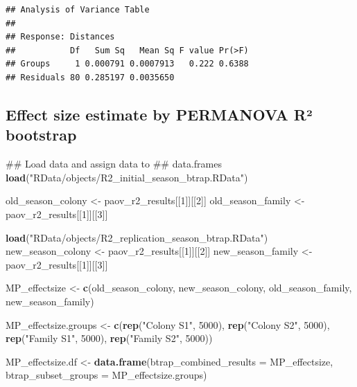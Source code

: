 \documentclass[]{article}
\newenvironment{Shaded}{\begin{snugshade}}{\end{snugshade}}
\newcommand{\KeywordTok}[1]{\textcolor[rgb]{0.13,0.29,0.53}{\textbf{#1}}}
\newcommand{\DataTypeTok}[1]{\textcolor[rgb]{0.13,0.29,0.53}{#1}}
\newcommand{\DecValTok}[1]{\textcolor[rgb]{0.00,0.00,0.81}{#1}}
\newcommand{\StringTok}[1]{\textcolor[rgb]{0.31,0.60,0.02}{#1}}
\newcommand{\NormalTok}[1]{#1}
\begin{document}
\begin{verbatim}
## Analysis of Variance Table
## 
## Response: Distances
##           Df   Sum Sq   Mean Sq F value Pr(>F)
## Groups     1 0.000791 0.0007913   0.222 0.6388
## Residuals 80 0.285197 0.0035650
\end{verbatim}

\subsection{Effect size estimate by PERMANOVA R²
bootstrap}\label{effect-size-estimate-by-permanova-r-bootstrap}

\begin{Shaded}
\begin{Highlighting}[]
\NormalTok{## Load data and assign data to}
\NormalTok{## data.frames}
\KeywordTok{load}\NormalTok{(}\StringTok{"RData/objects/R2_initial_season_btrap.RData"}\NormalTok{)}

\NormalTok{old_season_colony <-}\StringTok{ }\NormalTok{paov_r2_results[[}\DecValTok{1}\NormalTok{]][[}\DecValTok{2}\NormalTok{]]}
\NormalTok{old_season_family <-}\StringTok{ }\NormalTok{paov_r2_results[[}\DecValTok{1}\NormalTok{]][[}\DecValTok{3}\NormalTok{]]}

\KeywordTok{load}\NormalTok{(}\StringTok{"RData/objects/R2_replication_season_btrap.RData"}\NormalTok{)}
\NormalTok{new_season_colony <-}\StringTok{ }\NormalTok{paov_r2_results[[}\DecValTok{1}\NormalTok{]][[}\DecValTok{2}\NormalTok{]]}
\NormalTok{new_season_family <-}\StringTok{ }\NormalTok{paov_r2_results[[}\DecValTok{1}\NormalTok{]][[}\DecValTok{3}\NormalTok{]]}

\NormalTok{MP_effectsize <-}\StringTok{ }\KeywordTok{c}\NormalTok{(old_season_colony, new_season_colony, }
\NormalTok{    old_season_family, new_season_family)}

\NormalTok{MP_effectsize.groups <-}\StringTok{ }\KeywordTok{c}\NormalTok{(}\KeywordTok{rep}\NormalTok{(}\StringTok{"Colony S1"}\NormalTok{, }
    \DecValTok{5000}\NormalTok{), }\KeywordTok{rep}\NormalTok{(}\StringTok{"Colony S2"}\NormalTok{, }\DecValTok{5000}\NormalTok{), }\KeywordTok{rep}\NormalTok{(}\StringTok{"Family S1"}\NormalTok{, }
    \DecValTok{5000}\NormalTok{), }\KeywordTok{rep}\NormalTok{(}\StringTok{"Family S2"}\NormalTok{, }\DecValTok{5000}\NormalTok{))}

\NormalTok{MP_effectsize.df <-}\StringTok{ }\KeywordTok{data.frame}\NormalTok{(}\DataTypeTok{btrap_combined_results =}\NormalTok{ MP_effectsize, }
    \DataTypeTok{btrap_subset_groups =}\NormalTok{ MP_effectsize.groups)}
\end{Highlighting}
\end{Shaded}
\end{document}
